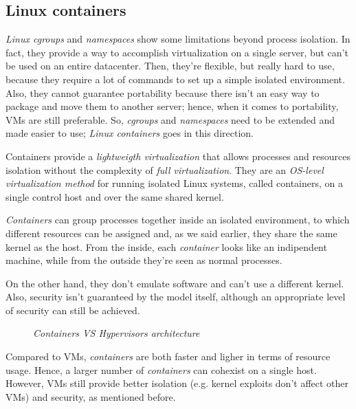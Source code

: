 \subsection{Linux containers}
\emph{Linux cgroups} and \emph{namespaces} show some limitations beyond
process isolation. In fact, they provide a way to accomplish virtualization on
a single server, but can't be used on an entire datacenter. Then, they're
flexible, but really hard to use, because they require a lot of commands to
set up a simple isolated environment. Also, they cannot guarantee portability
because there isn't an easy way to package and move them to another server;
hence, when it comes to portability, VMs are still preferable. So, \emph{cgroups}
and \emph{namespaces} need to be extended and made easier to use; \emph{Linux
containers} goes in this direction.

Containers provide a \emph{lightweigth virtualization} that allows processes and
resources isolation without the complexity of \emph{full virtualization}. They
are an \emph{OS-level virtualization method} for running isolated Linux
systems, called containers, on a single control host and over the same shared
kernel.

\emph{Containers} can group processes together inside an isolated environment,
to which different resources can be assigned and, as we said earlier, they share
the same kernel as the host. From the inside, each \emph{container} looks like
an indipendent machine, while from the outside they're seen as normal processes.

On the other hand, they don't emulate software and can't use a different kernel.
Also, security isn't guaranteed by the model itself, although an appropriate
level of security can still be achieved.

\begin{figure}[ht!]
    \centering
    \hspace{2.5cm}
    \caption{\emph{Containers VS Hypervisors architecture}}
\end{figure}

\noindent
Compared to VMs, \emph{containers} are both faster and ligher in terms of
resource usage. Hence, a larger number of \emph{containers} can cohexist on
a single host. However, VMs still provide better isolation (e.g. kernel
exploits don't affect other VMs) and security, as mentioned before.


